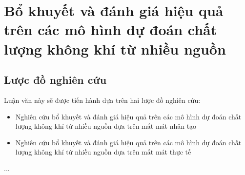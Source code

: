 \chapter{Bổ khuyết và đánh giá hiệu quả trên các mô hình dự đoán chất lượng không khí từ nhiều nguồn}
\section{Lược đồ nghiên cứu}

Luận văn này sẽ được tiến hành dựa trên hai lược đồ nghiên cứu:
\begin{itemize}
    \item Nghiên cứu bổ khuyết và đánh giá hiệu quả trên các mô hình dự đoán chất lượng không khí từ nhiều nguồn dựa trên mất mát nhân tạo
    \item Nghiên cứu bổ khuyết và đánh giá hiệu quả trên các mô hình dự đoán chất lượng không khí từ nhiều nguồn dựa trên mất mát thực tế
\end{itemize}


...

